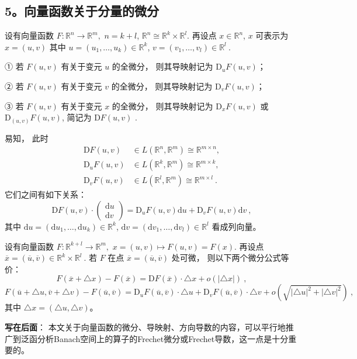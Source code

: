 \subsection{5。向量函数关于分量的微分}
设有向量函数 $F:\mathbb{R}^{n}\rightarrow\mathbb{R}^{m},$ $n=k+l$, $\mathbb{R}^{n}\cong\mathbb{R}^{k}\times\mathbb{R}^{l}$.
再设点 $x\in\mathbb{R}^{n}$, $x$ 可表示为 $x=(u,v)$ 其中 $u=(u_{1},\ldots,u_{k})\in\mathbb{R}^{k}$,
$v=(v_{1},\ldots,v_{l})\in\mathbb{R}^{l}~.$ 

① 若 $F(u,v)$ 有关于变元 $u$ 的全微分， 则其导映射记为 $\mathrm{D}_{u}F(u,v)$；

② 若 $F(u,v)$ 有关于变元 $v$ 的全微分， 则其导映射记为 $\mathrm{D}_{v}F(u,v)$；

③ 若 $F(u,v)$ 有关于变元 $x$ 的全微分， 则其导映射记为 $\mathrm{D}_{x}F(u,v)$ 或 $\mathrm{D}_{(u,v)}F(u,v)$,
简记为 $\mathrm{D}F(u,v)$ . 

易知， 此时 
$$
\begin{aligned}
\mathrm{D}F(u,v) & \in L(\mathbb{R}^{n},\mathbb{R}^{m})\cong\mathbb{R}^{m\times n},\\
\mathrm{D}_{u}F(u,v) & \in L(\mathbb{R}^{k},\mathbb{R}^{m})\cong\mathbb{R}^{m\times k},\\
\mathrm{D}_{v}F(u,v) & \in L(\mathbb{R}^{l},\mathbb{R}^{m})\cong\mathbb{R}^{m\times l}~.
\end{aligned}
$$
它们之间有如下关系：
$$
\mathrm{D}F(u,v)\cdot\left(\begin{array}{c}
\mathrm{d}u\\
\mathrm{d}v
\end{array}\right)=\mathrm{D}_{u}F(u,v)\mathrm{d}u+\mathrm{D}_{v}F(u,v)\mathrm{d}v~,
$$
其中 $\mathrm{d}u=(\mathrm{d}u_{1},\ldots,\mathrm{d}u_{k})\in\mathbb{R}^{k}$,
$\mathrm{d}v=(\mathrm{d}v_{1},\ldots,\mathrm{d}v_{l})\in\mathbb{R}^{l}$
看成列向量。 

设有向量函数 $F:\mathbb{R}^{k+l}\rightarrow\mathbb{R}^{m},$ $x=(u,v)\mapsto F(u,v)=F(x)$.
再设点 $\overline{x}=(\overline{u},\overline{v})\in\mathbb{R}^{k}\times\mathbb{R}^{l}~.$
若 $F$ 在点 $\overline{x}=(\overline{u},\overline{v})$ 处可微， 则以下两个微分公式等价：
\[
F(\overline{x}+\triangle x)-F(\overline{x})=\mathrm{D}F(\overline{x})\cdot\triangle x+o(|\triangle x|)~,
\]
\[
F(\overline{u}+\triangle u,\overline{v}+\triangle v)-F(\overline{u},\overline{v})=\mathrm{D}_{u}F(\overline{u},\overline{v})\cdot\triangle u+\mathrm{D}_{v}F(\overline{u},\overline{v})\cdot\triangle v+o(\sqrt{|\triangle u|^{2}+|\triangle v|^{2}})~,
\]
其中 $\triangle x=(\triangle u,\triangle v)$。

\textbf{写在后面}： 本文关于向量函数的微分、导映射、方向导数的内容，可以平行地推广到泛函分析Banach空间上的算子的Frechet微分或Frechet导数，这一点是十分重要的。
